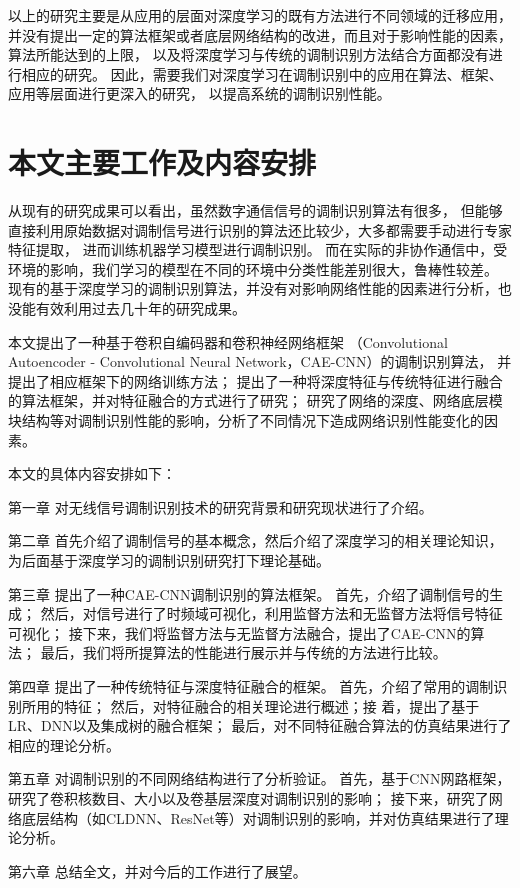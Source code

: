 以上的研究主要是从应用的层面对深度学习的既有方法进行不同领域的迁移应用，
并没有提出一定的算法框架或者底层网络结构的改进，而且对于影响性能的因素，算法所能达到的上限，
以及将深度学习与传统的调制识别方法结合方面都没有进行相应的研究。
因此，需要我们对深度学习在调制识别中的应用在算法、框架、应用等层面进行更深入的研究，
以提高系统的调制识别性能。\par

\section{本文主要工作及内容安排}
从现有的研究成果可以看出，虽然数字通信信号的调制识别算法有很多，
但能够直接利用原始数据对调制信号进行识别的算法还比较少，大多都需要手动进行专家特征提取，
进而训练机器学习模型进行调制识别。
而在实际的非协作通信中，受环境的影响，我们学习的模型在不同的环境中分类性能差别很大，鲁棒性较差。
现有的基于深度学习的调制识别算法，并没有对影响网络性能的因素进行分析，也没能有效利用过去几十年的研究成果。\par

本文提出了一种基于卷积自编码器和卷积神经网络框架
（Convolutional Autoencoder - Convolutional Neural Network，CAE-CNN）的调制识别算法，
并提出了相应框架下的网络训练方法；
提出了一种将深度特征与传统特征进行融合的算法框架，并对特征融合的方式进行了研究；
研究了网络的深度、网络底层模块结构等对调制识别性能的影响，分析了不同情况下造成网络识别性能变化的因素。 \par

本文的具体内容安排如下：

第一章 对无线信号调制识别技术的研究背景和研究现状进行了介绍。\par

第二章 首先介绍了调制信号的基本概念，然后介绍了深度学习的相关理论知识，
为后面基于深度学习的调制识别研究打下理论基础。 \par

第三章 提出了一种CAE-CNN调制识别的算法框架。
首先，介绍了调制信号的生成；
然后，对信号进行了时频域可视化，利用监督方法和无监督方法将信号特征可视化；
接下来，我们将监督方法与无监督方法融合，提出了CAE-CNN的算法；
最后，我们将所提算法的性能进行展示并与传统的方法进行比较。 \par

第四章 提出了一种传统特征与深度特征融合的框架。
首先，介绍了常用的调制识别所用的特征；
然后，对特征融合的相关理论进行概述；接
着，提出了基于LR、DNN以及集成树的融合框架；
最后，对不同特征融合算法的仿真结果进行了相应的理论分析。 \par

第五章 对调制识别的不同网络结构进行了分析验证。
首先，基于CNN网路框架，研究了卷积核数目、大小以及卷基层深度对调制识别的影响；
接下来，研究了网络底层结构（如CLDNN、ResNet等）对调制识别的影响，并对仿真结果进行了理论分析。\par

第六章 总结全文，并对今后的工作进行了展望。\par